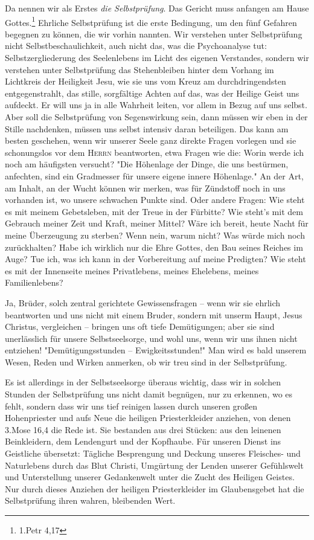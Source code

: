 \documentclass[a5paper,openany]{book}
\begin{document}
Da nennen wir als Erstes \emph{die Selbstprüfung}. Das Gericht muss anfangen am Hause Gottes.\footnote{1.Petr 4,17} Ehrliche  Selbstprüfung ist die erste Bedingung, um den fünf Gefahren begegnen zu können, die wir vorhin nannten. Wir verstehen unter Selbstprüfung nicht Selbstbeschaulichkeit, auch nicht das, was die Psychoanalyse tut: Selbstzergliederung des Seelenlebens im Licht des eigenen Verstandes, sondern wir verstehen unter Selbstprüfung das Stehenbleiben hinter dem Vorhang im Lichtkreis der Heiligkeit Jesu, wie sie uns vom Kreuz am durchdringendsten entgegenstrahlt, das stille, sorgfältige Achten auf das, was der Heilige Geist uns aufdeckt. Er will uns ja in alle Wahrheit leiten, vor allem in Bezug auf uns selbst. Aber soll die Selbstprüfung von Segenswirkung sein, dann müssen wir eben in der Stille nachdenken, müssen uns selbst intensiv daran beteiligen. Das kann am besten geschehen, wenn wir unserer Seele ganz direkte Fragen vorlegen und sie schonungslos vor dem \textsc{Herrn} beantworten, etwa Fragen wie die: Worin werde ich noch am häufigsten versucht? "Die Höhenlage der Dinge, die uns bestürmen, anfechten, sind ein Gradmesser für unsere eigene innere Höhenlage." An der Art, am Inhalt, an der Wucht können wir merken, was für Zündstoff noch in uns vorhanden ist, wo unsere schwachen Punkte sind. Oder andere Fragen: Wie steht es mit meinem Gebetsleben, mit der Treue in der Fürbitte? Wie steht's mit dem Gebrauch meiner Zeit und Kraft, meiner Mittel? Wäre ich bereit, heute Nacht für meine Überzeugung zu sterben? Wenn nein, warum nicht? Was würde mich noch zurückhalten? Habe ich wirklich nur die Ehre Gottes, den Bau seines Reiches im Auge? Tue ich, was ich kann in der Vorbereitung auf meine Predigten? Wie steht es mit der Innenseite meines Privatlebens, meines Ehelebens, meines Familienlebens?
\par
Ja, Brüder, solch zentral gerichtete Gewissensfragen – wenn wir sie ehrlich beantworten und uns nicht mit einem Bruder, sondern mit unserm Haupt, Jesus Christus, vergleichen – bringen uns oft tiefe Demütigungen; aber sie sind unerlässlich für unsere Selbstseelsorge, und wohl uns, wenn wir uns ihnen nicht entziehen! "Demütigungsstunden – Ewigkeitsstunden!" Man wird es bald unserem Wesen, Reden und Wirken anmerken, ob wir treu sind in der Selbstprüfung.
\par
Es ist allerdings in der Selbstseelsorge überaus wichtig, dass wir in solchen Stunden der Selbstprüfung uns nicht damit begnügen, nur zu erkennen, wo es fehlt, sondern dass wir uns tief reinigen lassen durch unseren großen Hohenpriester und aufs Neue die heiligen Priesterkleider anziehen, von denen 3.Mose 16,4 die Rede ist. Sie bestanden aus drei Stücken: aus den leinenen Beinkleidern, dem Lendengurt und der Kopfhaube. Für unseren Dienst ins Geistliche übersetzt: Tägliche Besprengung und Deckung unseres Fleisches- und Naturlebens durch das Blut Christi, Umgürtung der Lenden unserer Gefühlswelt und Unterstellung unserer Gedankenwelt unter die Zucht des Heiligen Geistes. Nur durch dieses Anziehen der heiligen Priesterkleider im Glaubensgebet hat die Selbstprüfung ihren wahren, bleibenden Wert.
\end{document}

